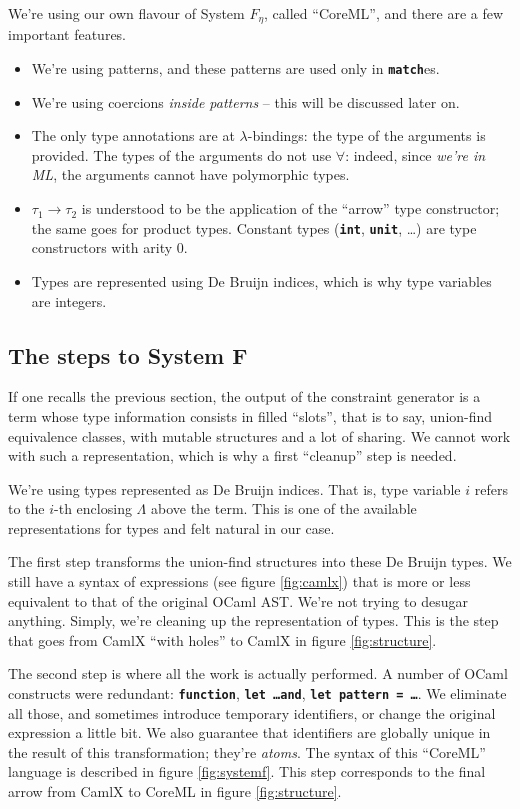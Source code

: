 \documentclass[10pt,a4paper,twoside,titlepage,twocolumn]{article}
\newcommand{\code}[1]{\textbf{\texttt{#1}}}
\begin{document}
We're using our own flavour of System $F_\eta$, called ``CoreML'', and
there are a few important features.
\begin{itemize}
  \item We're using patterns, and these patterns are used only in
    \code{match}es.
  \item We're using coercions \emph{inside patterns} -- this will be discussed
    later on.
  \item The only type annotations are at $\lambda$-bindings: the type of the
    arguments is provided. The types of the arguments do not use $\forall$:
    indeed, since \emph{we're in ML}, the arguments cannot have polymorphic
    types.
  \item $\tau_1 \to \tau_2$ is understood to be the application of the ``arrow''
    type constructor; the same goes for product types. Constant types
    (\code{int}, \code{unit}, …) are type constructors with arity 0.
  \item Types are represented using De Bruijn indices, which is why type
    variables are integers.
\end{itemize}

\subsection{The steps to System F}

If one recalls the previous section, the output of the constraint generator is a
term whose type information consists in filled ``slots'', that is to say,
union-find equivalence classes, with mutable structures and a lot of sharing. We
cannot work with such a representation, which is why a first ``cleanup'' step is
needed.

We're using types represented as De Bruijn indices. That is, type variable
$i$ refers to the $i$-th enclosing $\Lambda$ above the term. This is one of the
available representations for types and felt natural in our case.

The first step transforms the union-find structures into these De Bruijn types.
We still have a syntax of expressions (see figure \vref{fig:camlx}) that is
more or less equivalent to that of the original OCaml AST. We're not trying to
desugar anything. Simply, we're cleaning up the representation of types. This
is the step that goes from CamlX ``with holes'' to CamlX in figure
\ref{fig:structure}.

The second step is where all the work is actually performed. A number of OCaml
constructs were redundant: \code{function}, \code{let \dots\;and}, \code{let
pattern = \dots}. We eliminate all those, and sometimes introduce temporary
identifiers, or change the original expression a little bit. We also guarantee
that identifiers are globally unique in the result of this transformation;
they're \emph{atoms}. The syntax of this ``CoreML'' language is described in
figure \vref{fig:systemf}. This step corresponds to the final arrow from CamlX
to CoreML in figure \ref{fig:structure}.
\end{document}
